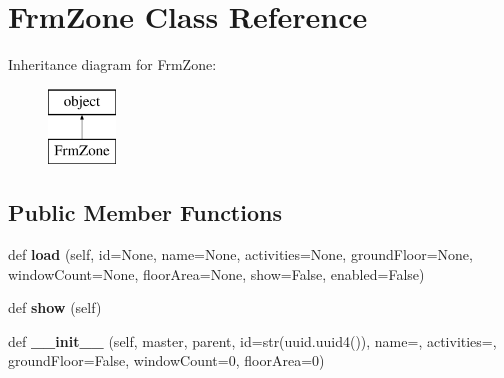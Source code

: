 \hypertarget{class_f_zone_1_1_frm_zone}{}\section{Frm\+Zone Class Reference}
\label{class_f_zone_1_1_frm_zone}
Inheritance diagram for Frm\+Zone\+:\begin{figure}[H]
\begin{center}
\leavevmode
\includegraphics[height=2.000000cm]{class_f_zone_1_1_frm_zone}
\end{center}
\end{figure}
\subsection*{Public Member Functions}
\begin{DoxyCompactItemize}
\item 
\mbox{\label{class_f_zone_1_1_frm_zone_ad5638cba1e16dbbca63151f4ac04ed4e}} 
def {\bfseries load} (self, id=None, name=None, activities=None, ground\+Floor=None, window\+Count=None, floor\+Area=None, show=False, enabled=False)
\item 
\mbox{\label{class_f_zone_1_1_frm_zone_ab4f4398c3f210fe4ea6e720401357691}} 
def {\bfseries show} (self)
\item 
\mbox{\label{class_f_zone_1_1_frm_zone_a749ac72aadf70cac935210a79fc0cf5d}} 
def {\bfseries \+\_\+\+\_\+init\+\_\+\+\_\+} (self, master, parent, id=str(uuid.\+uuid4()), name=\textquotesingle{}\textquotesingle{}, activities=\textquotesingle{}\textquotesingle{}, ground\+Floor=False, window\+Count=0, floor\+Area=0)
\end{DoxyCompactItemize}

